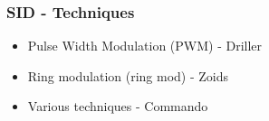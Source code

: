 \documentclass{beamer}
\begin{document}

\begin{frame}
\frametitle{SID - Techniques}

\begin{itemize}
\item Pulse Width Modulation (PWM) - Driller
\item Ring modulation (ring mod) - Zoids
\item Various techniques - Commando
\end{itemize}

\end{frame}

\end{document}
